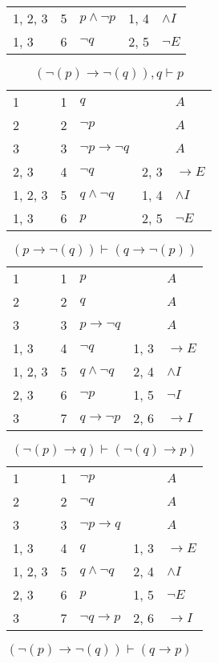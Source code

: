 \documentclass{article}
\begin{document}
\begin{table}[htbp]
\begin{tabular}{lrlll}
{1, 2, 3} & 5 & $p∧ ¬p$ & {1, 4} & $∧I$ \\
{1, 3} & 6 & $¬q$ & {2, 5} & $¬E$ \\
\end{tabular}
\end{table}\begin{table}[htbp]\caption*{$(¬(p) → ¬(q)),q ⊢ p$}\centering\begin{tabular}{lrlll}
{1} & 1 & $q$ & {} & $A$ \\
{2} & 2 & $¬p$ & {} & $A$ \\
{3} & 3 & $¬p→ ¬q$ & {} & $A$ \\
{2, 3} & 4 & $¬q$ & {2, 3} & $→E$ \\
{1, 2, 3} & 5 & $q∧ ¬q$ & {1, 4} & $∧I$ \\
{1, 3} & 6 & $p$ & {2, 5} & $¬E$ \\
\end{tabular}
\end{table}\begin{table}[htbp]\caption*{$(p → ¬(q)) ⊢ (q → ¬(p))$}\centering\begin{tabular}{lrlll}
{1} & 1 & $p$ & {} & $A$ \\
{2} & 2 & $q$ & {} & $A$ \\
{3} & 3 & $p→ ¬q$ & {} & $A$ \\
{1, 3} & 4 & $¬q$ & {1, 3} & $→E$ \\
{1, 2, 3} & 5 & $q∧ ¬q$ & {2, 4} & $∧I$ \\
{2, 3} & 6 & $¬p$ & {1, 5} & $¬I$ \\
{3} & 7 & $q→ ¬p$ & {2, 6} & $→I$ \\
\end{tabular}
\end{table}\begin{table}[htbp]\caption*{$(¬(p) → q) ⊢ (¬(q) → p)$}\centering\begin{tabular}{lrlll}
{1} & 1 & $¬p$ & {} & $A$ \\
{2} & 2 & $¬q$ & {} & $A$ \\
{3} & 3 & $¬p→q$ & {} & $A$ \\
{1, 3} & 4 & $q$ & {1, 3} & $→E$ \\
{1, 2, 3} & 5 & $q∧ ¬q$ & {2, 4} & $∧I$ \\
{2, 3} & 6 & $p$ & {1, 5} & $¬E$ \\
{3} & 7 & $¬q→p$ & {2, 6} & $→I$ \\
\end{tabular}
\end{table}\begin{table}[htbp]\caption*{$(¬(p) → ¬(q)) ⊢ (q → p)$}\centering\begin{tabular}{lrlll}

\end{tabular}
\end{table}
\end{document}
